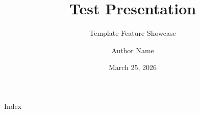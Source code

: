 \documentclass{beamer}
\title{Test Presentation}
\subtitle{Template Feature Showcase}
\author{Author Name}
\date{March 25, 2026}
\begin{document}
\begin{frame}[plain]
  \titlepage
\end{frame}

\begin{frame}{Index}
  \tiny
  \tableofcontents
\end{frame}









\end{document}
